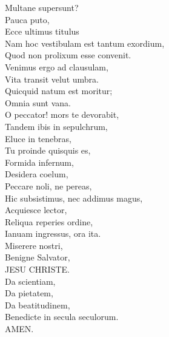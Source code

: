 \documentclass[12pt, twocolumn]{memoir}
\begin{document}
Multane supersunt?\\
Pauca puto,\\
Ecce ultimus titulus \\
Nam hoc vestibulam est tantum exordium,\\
Quod non prolixum esse convenit.\\
Venimus ergo ad clausulam,\\
Vita transit velut umbra.\\
Quicquid natum est moritur;\\
Omnia sunt vana.\\
O peccator! mors te devorabit,\\
Tandem ibis in sepulchrum,\\
Eluce in tenebras,\\
Tu proinde quisquis es,\\
Formida infernum,\\
Desidera coelum,\\
Peccare noli, ne pereas,\\
Hic subsistimus, nec addimus magus,\\
Acquiesce lector,\\
Reliqua reperies ordine,\\
Ianuam ingressus, ora ita.\\
Miserere nostri,\\
Benigne Salvator,\\
JESU CHRISTE.\\
Da scientiam,\\
Da pietatem,\\
Da beatitudinem,\\
Benedicte in secula seculorum.\\
AMEN.\\
\end{document}
